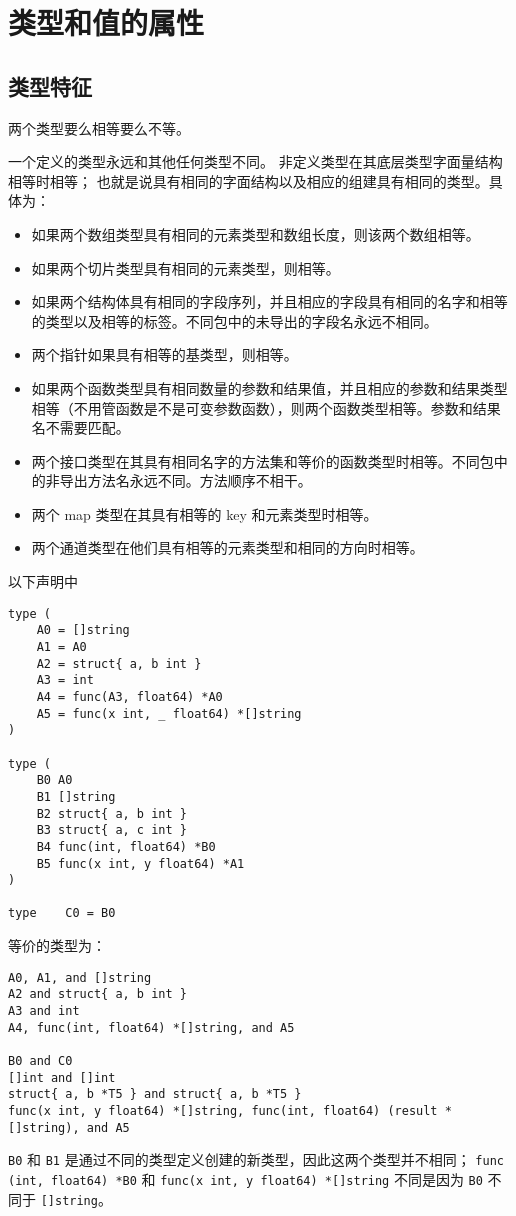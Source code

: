 \chapter{类型和值的属性}

\section{类型特征}
两个类型要么相等要么不等。

一个定义的类型永远和其他任何类型不同。
非定义类型在其底层类型字面量结构相等时相等；
也就是说具有相同的字面结构以及相应的组建具有相同的类型。具体为：
\begin{itemize}
\item 如果两个数组类型具有相同的元素类型和数组长度，则该两个数组相等。
\item 如果两个切片类型具有相同的元素类型，则相等。
\item 如果两个结构体具有相同的字段序列，并且相应的字段具有相同的名字和相等的类型以及相等的标签。不同包中的未导出的字段名永远不相同。
\item 两个指针如果具有相等的基类型，则相等。
\item 如果两个函数类型具有相同数量的参数和结果值，并且相应的参数和结果类型相等（不用管函数是不是可变参数函数），则两个函数类型相等。参数和结果名不需要匹配。
\item 两个接口类型在其具有相同名字的方法集和等价的函数类型时相等。不同包中的非导出方法名永远不同。方法顺序不相干。
\item 两个 map 类型在其具有相等的 key 和元素类型时相等。
\item 两个通道类型在他们具有相等的元素类型和相同的方向时相等。
\end{itemize}

以下声明中
\begin{lstlisting}[style=golang]
type (
	A0 = []string
	A1 = A0
	A2 = struct{ a, b int }
	A3 = int
	A4 = func(A3, float64) *A0
	A5 = func(x int, _ float64) *[]string
)

type (
	B0 A0
	B1 []string
	B2 struct{ a, b int }
	B3 struct{ a, c int }
	B4 func(int, float64) *B0
	B5 func(x int, y float64) *A1
)

type	C0 = B0
\end{lstlisting}
等价的类型为：
\begin{lstlisting}[style=golang]
A0, A1, and []string
A2 and struct{ a, b int }
A3 and int
A4, func(int, float64) *[]string, and A5

B0 and C0
[]int and []int
struct{ a, b *T5 } and struct{ a, b *T5 }
func(x int, y float64) *[]string, func(int, float64) (result *[]string), and A5
\end{lstlisting}
\lstinline|B0| 和 \lstinline|B1| 是通过不同的类型定义创建的新类型，因此这两个类型并不相同；
\lstinline[style=golang]|func (int, float64) *B0| 和 \lstinline[style=golang]|func(x int, y float64) *[]string| 不同是因为 \lstinline|B0| 不同于 \lstinline[style=golang]|[]string|。



